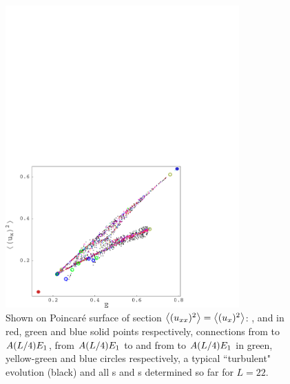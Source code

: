 \begin{figure}[t] \label{f:drivedragPoinc}
\begin{center}
    \includegraphics[width=0.8\textwidth]{../figs/energyPoinc}
\end{center}
\caption[Poincar\'{e} surface of section for L=22]
        {
Shown on Poincar\'{e} surface of section
$\left\langle {(u_{xx})^2} \right\rangle = \left\langle {(u_{x})^2} \right\rangle$:
,  and  in red, green and blue solid points respectively,
connections from  to $A(L/4)E_{1}$,
from $A(L/4)E_{1}$ to  and from  to $A(L/4)E_{1}$ in green,
yellow-green and blue circles respectively,
a typical ``turbulent" evolution (black) and all \po s and \rpo s
determined so far for $L=22$.
        }
\end{figure}


